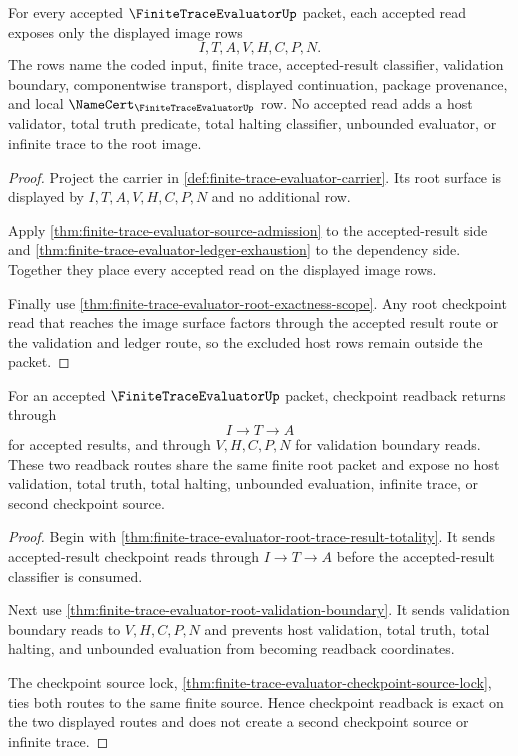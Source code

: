 \begin{theorem}
\label{thm:finite-trace-evaluator-root-image-row}
For every accepted $\FiniteTraceEvaluatorUp$ packet, each accepted read exposes
only the displayed image rows
$$
I,T,A,V,H,C,P,N.
$$
The rows name the coded input, finite trace, accepted-result classifier,
validation boundary, componentwise transport, displayed continuation, package
provenance, and local $\NameCert_{\FiniteTraceEvaluatorUp}$ row. No accepted
read adds a host validator, total truth predicate, total halting classifier,
unbounded evaluator, or infinite trace to the root image.
\end{theorem}
\begin{proof}
Project the carrier in \autoref{def:finite-trace-evaluator-carrier}. Its root
surface is displayed by $I,T,A,V,H,C,P,N$ and no additional row.

Apply \autoref{thm:finite-trace-evaluator-source-admission} to the
accepted-result side and
\autoref{thm:finite-trace-evaluator-ledger-exhaustion} to the dependency side.
Together they place every accepted read on the displayed image rows.

Finally use \autoref{thm:finite-trace-evaluator-root-exactness-scope}. Any root
checkpoint read that reaches the image surface factors through the accepted
result route or the validation and ledger route, so the excluded host rows
remain outside the packet.
\end{proof}

\begin{theorem}
\label{thm:finite-trace-evaluator-root-readback-exactness}
For an accepted $\FiniteTraceEvaluatorUp$ packet, checkpoint readback returns
through
$$
I \to T \to A
$$
for accepted results, and through $V,H,C,P,N$ for validation boundary reads.
These two readback routes share the same finite root packet and expose no host
validation, total truth, total halting, unbounded evaluation, infinite trace, or
second checkpoint source.
\end{theorem}
\begin{proof}
Begin with \autoref{thm:finite-trace-evaluator-root-trace-result-totality}. It
sends accepted-result checkpoint reads through $I \to T \to A$ before the
accepted-result classifier is consumed.

Next use \autoref{thm:finite-trace-evaluator-root-validation-boundary}. It
sends validation boundary reads to $V,H,C,P,N$ and prevents host validation,
total truth, total halting, and unbounded evaluation from becoming readback
coordinates.

The checkpoint source lock,
\autoref{thm:finite-trace-evaluator-checkpoint-source-lock}, ties both routes
to the same finite source. Hence checkpoint readback is exact on the two
displayed routes and does not create a second checkpoint source or infinite
trace.
\end{proof}

